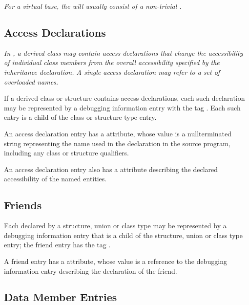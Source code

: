 \textit{For a  virtual base, the 
will usually consist of a non-trivial 
.}

\subsection{Access Declarations}
\label{chap:accessdeclarations}

\textit{In , a derived class may contain access declarations that
change the accessibility of individual class members from the
overall accessibility specified by the inheritance declaration.
A single access declaration may refer to a set of overloaded
names.}

If a derived class or structure contains access declarations,
each such declaration may be represented by a debugging
information entry with the tag 
\DWTAGaccessdeclarationTARG. 
Each
such entry is a child of the class or structure type entry.

An access declaration entry has 
a \DWATname{} attribute, 
whose
value is a null\dash terminated string representing the name used
in the declaration in the source program, including any class
or structure qualifiers.

An access declaration entry 
\hypertarget{chap:DWATaccessibilitycppbaseclasses}{}
also 
has a 
\DWATaccessibility{}
attribute describing the declared accessibility of the named
entities.


\subsection{Friends}
\label{chap:friends}

Each  
declared by a structure, union or class
\hypertarget{chap:DWATfriendfriendrelationship}{}
type may be represented by a debugging information entry
that is a child of the structure, union or class type entry;
the friend entry has the 
tag \DWTAGfriendTARG.

A friend entry has 
a \DWATfriend{} attribute, whose value is
a reference to the debugging information entry describing
the declaration of the friend.


\subsection{Data Member Entries}
\label{chap:datamemberentries}

